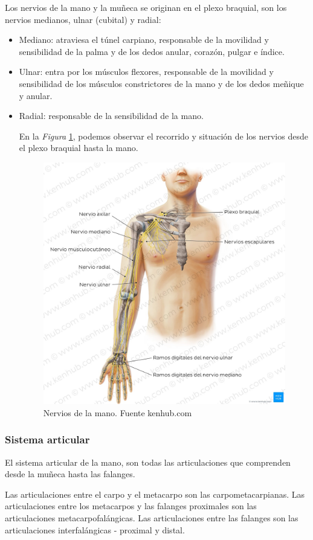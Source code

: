 Los nervios de la mano y la muñeca se originan en el plexo braquial, son los nervios medianos, ulnar (cubital) y radial\cite{mano_anatomía}:
\begin{itemize}
    \item Mediano: atraviesa el túnel carpiano, responsable de la movilidad y sensibilidad de la palma y de los dedos anular, corazón, pulgar e índice.
    \item Ulnar: entra por los músculos flexores, responsable de la movilidad y sensibilidad de los músculos constrictores de la mano y de los dedos meñique y anular.
    \item Radial: responsable de la sensibilidad de la mano.


En la \textit{Figura} \ref{fig:nervios de la mano}, podemos observar el recorrido y situación de los nervios desde el plexo braquial hasta la mano.
\begin{figure}
    \centering
    \includegraphics[width=0.8\linewidth]{img/Mano_nervios.png}
    \caption{Nervios de la mano. Fuente kenhub.com}
    \label{fig:nervios de la mano}
\end{figure}
\end{itemize}
\subsubsection{Sistema articular}

El sistema articular de la mano, son todas las articulaciones que comprenden desde la muñeca hasta las falanges. 

Las articulaciones entre el carpo y el metacarpo son las carpometacarpianas. Las articulaciones entre los metacarpos y las falanges proximales son las articulaciones metacarpofalángicas. Las articulaciones entre las falanges son las articulaciones interfalángicas - proximal y distal. \cite{huesos_mano}
